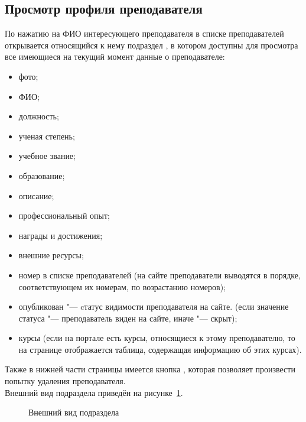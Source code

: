 \subsection{Просмотр профиля преподавателя}\label{instructor:detail_section}
По нажатию на ФИО интересующего преподавателя в списке преподавателей открывается относящийся к нему подраздел , в котором доступны для просмотра все имеющиеся на текущий момент данные о преподавателе:
\begin{itemize}
	\item фото;
	\item ФИО;
	\item должность;
	\item ученая степень;
	\item учебное звание;
	\item образование;
	\item описание;
	\item профессиональный опыт;
	\item награды и достижения;
	\item внешние ресурсы;
	\item номер в списке преподавателей (на сайте преподаватели выводятся в порядке, соответствующем их номерам, по возрастанию номеров);
	\item опубликован "--- cтатус видимости преподавателя на сайте. (если значение статуса  "--- преподаватель виден на сайте, иначе "--- скрыт);
	\item курсы (если на портале есть курсы, относящиеся к этому преподавателю, то на странице отображается таблица, содержащая информацию об этих курсах).
\end{itemize}
Также в нижней части страницы имеется кнопка , которая позволяет произвести попытку удаления преподавателя. \\
Внешний вид подраздела приведён на рисунке~\ref{instructor:detail}.

	\begin{figure}[H]
	\caption{Внешний вид подраздела }
	\label{instructor:detail}
	\end{figure}
	
